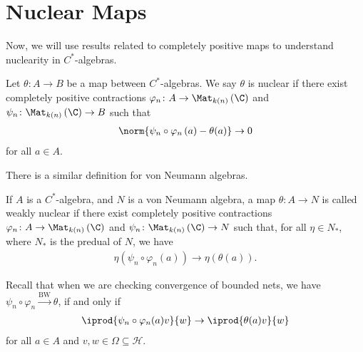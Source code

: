 \documentclass[10pt]{mypackage}
\begin{document}
\section{Nuclear Maps}%
Now, we will use results related to completely positive maps to understand nuclearity in $C^{\ast}$-algebras.
\begin{definition}
  Let $\theta\colon A\rightarrow B$ be a map between $C^{\ast}$-algebras. We say $\theta$ is nuclear if there exist completely positive contractions $\varphi_n\colon A\rightarrow \Mat_{k(n)}\left( \C \right)$ and $\psi_n\colon \Mat_{k(n)}\left( \C \right)\rightarrow B$ such that
  \begin{align*}
    \norm{\psi_n\circ \varphi_n\left( a \right) - \theta(a)}\rightarrow 0
  \end{align*}
  for all $a\in A$.
\end{definition}
There is a similar definition for von Neumann algebras.
\begin{definition}
  If $A$ is a $C^{\ast}$-algebra, and $N$ is a von Neumann algebra, a map $\theta\colon A\rightarrow N$ is called weakly nuclear if there exist completely positive contractions $\varphi_n\colon A\rightarrow \Mat_{k(n)}\left( \C \right)$ and $\psi_n\colon \Mat_{k(n)} \left( \C \right)\rightarrow N$ such that, for all $\eta\in N_{\ast}$, where $N_{\ast}$ is the predual of $N$, we have
  \begin{align*}
    \eta\left( \psi_n\circ \varphi_{n}\left( a \right) \right) \rightarrow \eta\left( \theta\left( a \right) \right).
  \end{align*}
\end{definition}
Recall that when we are checking convergence of bounded nets, we have $\psi_n\circ\varphi_n\xrightarrow{\text{BW}} \theta$, if and only if
\begin{align*}
  \iprod{\psi_n\circ\varphi_n(a)v}{w} \rightarrow \iprod{\theta(a)v}{w}
\end{align*}
for all $a\in A$ and $v,w\in \Omega\subseteq \mathcal{H}$.\newline
\end{document}
